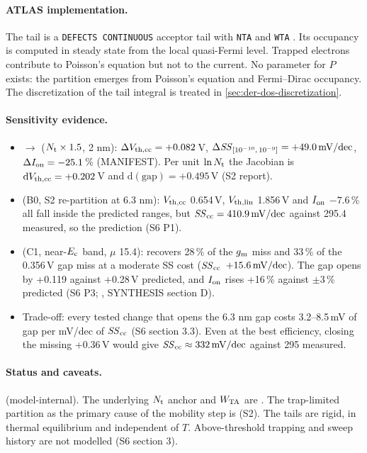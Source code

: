 \paragraph{ATLAS implementation.}
The tail is a \texttt{DEFECTS CONTINUOUS} acceptor tail with \texttt{NTA} and \texttt{WTA} \citep[pp.~1169, 1171, 1173]{AtlasManual}. Its occupancy is computed in steady state from the local quasi-Fermi level. Trapped electrons contribute to Poisson's equation but not to the current. No parameter for $P$ exists: the partition emerges from Poisson's equation and Fermi--Dirac occupancy. The discretization of the tail integral is treated in \cref{sec:der-dos-discretization}.

\paragraph{Sensitivity evidence.}
\begin{itemize}
\item {} $\rightarrow$  ($N_{\mathrm{t}}\times1.5$, 2 nm): $\Delta V_{\mathrm{th,cc}}=+0.082$\,V, $\Delta\mathit{SS}_{[10^{-10},\,10^{-9}]}=+49.0\,\mathrm{mV/dec}$, $\Delta I_{\mathrm{on}}=-25.1$\,\% (MANIFEST). Per unit $\ln N_{\mathrm{t}}$ the Jacobian is $\mathrm{d}V_{\mathrm{th,cc}}=+0.202$\,V and $\mathrm{d}(\text{gap})=+0.495$\,V (S2 report).
\item {} (B0, S2 re-partition at 6.3 nm): $V_{\mathrm{th,cc}}$ 0.654\,V, $V_{\mathrm{th,lin}}$ 1.856\,V and $I_{\mathrm{on}}$ $-7.6$\,\% all fall inside the predicted ranges, but $\mathit{SS}_{\mathrm{cc}} = 410.9\,\mathrm{mV/dec}$ against 295.4 measured, so the prediction  (S6 P1).
\item {} (C1, near-$E_{\mathrm{c}}$ band, $\mu$ 15.4): recovers 28\,\% of the $g_{\mathrm{m}}$ miss and 33\,\% of the 0.356\,V gap miss at a moderate SS cost ($\mathit{SS}_{\mathrm{cc}}$ $+15.6\,\mathrm{mV/dec}$). The gap opens by +0.119 against +0.28\,V predicted, and $I_{\mathrm{on}}$ rises +16\,\% against $\pm3$\,\% predicted (S6 P3; , SYNTHESIS section D).
\item Trade-off: every tested change that opens the 6.3 nm gap costs 3.2--8.5\,mV of gap per mV/dec of $\mathit{SS}_{\mathrm{cc}}$ (S6 section 3.3). Even at the best efficiency, closing the missing +0.36\,V would give $\mathit{SS}_{\mathrm{cc}}\approx332\,\mathrm{mV/dec}$ against 295 measured.
\end{itemize}

\paragraph{Status and caveats.}
 (model-internal). The underlying $N_{\mathrm{t}}$ anchor and $W_{\mathrm{TA}}$ are . The trap-limited partition as the primary cause of the mobility step is  (S2). The tails are rigid, in thermal equilibrium and independent of $T$. Above-threshold trapping and sweep history are not modelled (S6 section 3).

